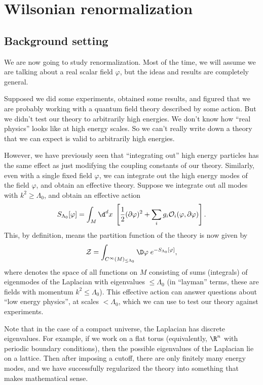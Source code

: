 \documentclass[a4paper]{article}
\begin{document}
\section{Wilsonian renormalization}
\subsection{Background setting}
We are now going to study renormalization. Most of the time, we will assume we are talking about a real scalar field $\varphi$, but the ideas and results are completely general.

Supposed we did some experiments, obtained some results, and figured that we are probably working with a quantum field theory described by some action. But we didn't test our theory to arbitrarily high energies. We don't know how ``real physics'' looks like at high energy scales. So we can't really write down a theory that we can expect is valid to arbitrarily high energies.

However, we have previously seen that ``integrating out'' high energy particles has the same effect as just modifying the coupling constants of our theory. Similarly, even with a single fixed field $\varphi$, we can integrate out the high energy modes of the field $\varphi$, and obtain an effective theory. Suppose we integrate out all modes with $k^2 \geq \Lambda_0$, and obtain an effective action
\[
  S_{\Lambda_0} [\varphi] = \int_M \d^d x\; \left[\frac{1}{2}(\partial \varphi)^2 + \sum_i g_i \mathcal{O}_i(\varphi , \partial\varphi)\right].
\]
This, by definition, means the partition function of the theory is now given by
\[
  \mathcal{Z} = \int_{C^\infty(M)_{\leq \Lambda_0}} \D \varphi\;e^{-S_{\Lambda_0}[\varphi]},
\]
where  denotes the space of all functions on $M$ consisting of sums (integrals) of eigenmodes of the Laplacian with eigenvalues $\leq \Lambda_0$ (in ``layman'' terms, these are fields with momentum $k^2 \leq \Lambda_0$). This effective action can answer questions about ``low energy physics'', at scales $< \Lambda_0$, which we can use to test our theory against experiments.

Note that in the case of a compact universe, the Laplacian has discrete eigenvalues. For example, if we work on a flat torus (equivalently, $\R^n$ with periodic boundary conditions), then the possible eigenvalues of the Laplacian lie on a lattice. Then after imposing a cutoff, there are only finitely many energy modes, and we have successfully regularized the theory into something that makes mathematical sense.
\end{document}
